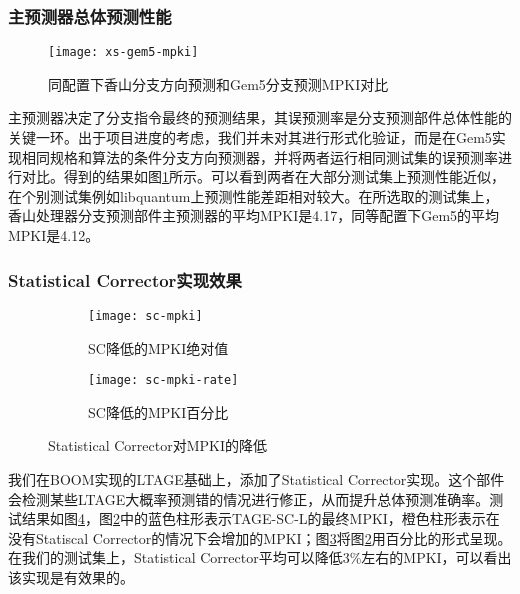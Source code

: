 \subsubsection*{主预测器总体预测性能}
\begin{figure}[!htbp]
    \centering
    \texttt{[image: xs-gem5-mpki]}
    \caption{同配置下香山分支方向预测和Gem5分支预测MPKI对比}
    \label{fig:xs-gem5-mpki}
\end{figure}
主预测器决定了分支指令最终的预测结果，其误预测率是分支预测部件总体性能的关键一环。出于项目进度的考虑，我们并未对其进行形式化验证，而是在Gem5实现相同规格和算法的条件分支方向预测器，并将两者运行相同测试集的误预测率进行对比。得到的结果如图\ref{fig:xs-gem5-mpki}所示。可以看到两者在大部分测试集上预测性能近似，在个别测试集例如libquantum上预测性能差距相对较大。在所选取的测试集上，香山处理器分支预测部件主预测器的平均MPKI是4.17，同等配置下Gem5的平均MPKI是4.12。

\subsubsection*{Statistical Corrector实现效果}
\begin{figure}[!htbp]
    \begin{subfigure}{.45\textwidth}
        \centering
        \texttt{[image: sc-mpki]}
        \caption{SC降低的MPKI绝对值}
        \label{fig:sc-mpki}
    \end{subfigure}
    \begin{subfigure}{.45\textwidth}
        \centering
        \texttt{[image: sc-mpki-rate]}
        \caption{SC降低的MPKI百分比}
        \label{fig:sc-mpki-rate}
    \end{subfigure}
    \caption{Statistical Corrector对MPKI的降低}
    \label{fig:sc}
\end{figure}
我们在BOOM实现的LTAGE基础上，添加了Statistical Corrector实现。这个部件会检测某些LTAGE大概率预测错的情况进行修正，从而提升总体预测准确率。测试结果如图\ref{fig:sc}，图\ref{fig:sc-mpki}中的蓝色柱形表示TAGE-SC-L的最终MPKI，橙色柱形表示在没有Statiscal Corrector的情况下会增加的MPKI；图\ref{fig:sc-mpki-rate}将图\ref{fig:sc-mpki}用百分比的形式呈现。在我们的测试集上，Statistical Corrector平均可以降低3\%左右的MPKI，可以看出该实现是有效果的。

